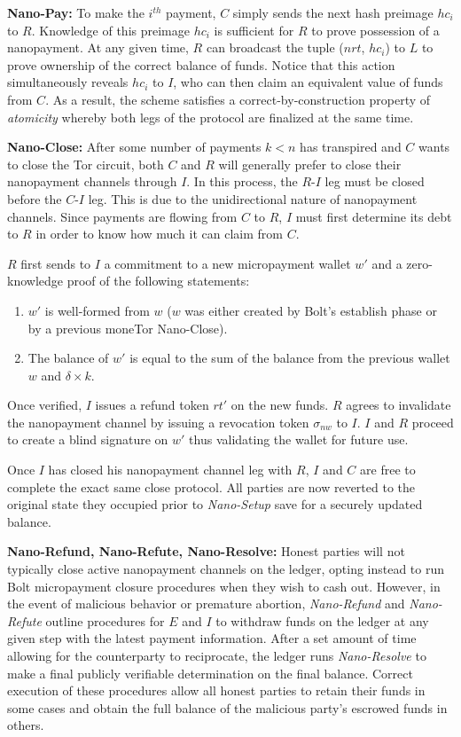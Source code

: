 \medskip \noindent\textbf{Nano-Pay:} To make the $i^{th}$ payment, $C$ simply sends the next hash preimage $hc_i$ to $R$.
Knowledge of this preimage $hc_i$ is sufficient for $R$ to prove possession of a nanopayment.
At any given time, $R$ can broadcast the tuple ($nrt$, $hc_i$) to $L$ to prove ownership of the correct balance of funds.
Notice that this action simultaneously reveals $hc_i$ to $I$, who can then claim an equivalent value of funds from $C$.
As a result, the scheme satisfies a correct-by-construction property of \emph{atomicity} whereby both legs of the protocol are finalized at the same time.

\medskip \noindent\textbf{Nano-Close:} After some number of payments $k < n$ has transpired and $C$ wants to close the Tor circuit, both $C$ and $R$ will generally prefer to close their nanopayment channels through $I$.
In this process, the $R$-$I$ leg must be closed before the $C$-$I$ leg.
This is due to the unidirectional nature of nanopayment channels.
Since payments are flowing from $C$ to $R$, $I$ must first determine its debt to $R$ in order to know how much it can claim from $C$.

$R$ first sends to $I$ a commitment to a new micropayment wallet $w'$ and a zero-knowledge proof of the following statements:

\begin{enumerate}
\item $w'$ is well-formed from $w$ ($w$ was either created by Bolt's establish phase or by a previous moneTor Nano-Close).
\item The balance of $w'$ is equal to the sum of the balance from the previous wallet $w$ and $\delta \times k$.
\end{enumerate}

Once verified, $I$ issues a refund token $rt'$ on the new funds.
$R$ agrees to invalidate the nanopayment channel by issuing a revocation token $\sigma_{nw}$ to $I$.
$I$ and $R$ proceed to create a blind signature on $w'$ thus validating the wallet for future use.

Once $I$ has closed his nanopayment channel leg with $R$, $I$ and $C$ are free to complete the exact same close protocol.
All parties are now reverted to the original state they occupied prior to \emph{Nano-Setup} save for a securely updated balance.

\medskip \noindent\textbf{Nano-Refund, Nano-Refute, Nano-Resolve:} Honest parties will not typically close active nanopayment channels on the ledger, opting instead to run Bolt micropayment closure procedures when they wish to cash out.
However, in the event of malicious behavior or premature abortion, \emph{Nano-Refund} and \emph{Nano-Refute} outline procedures for $E$ and $I$ to withdraw funds on the ledger at any given step with the latest payment information.
After a set amount of time allowing for the counterparty to reciprocate, the ledger runs \emph{Nano-Resolve} to make a final publicly verifiable determination on the final balance.
Correct execution of these procedures allow all honest parties to retain their funds in some cases and obtain the full balance of the malicious party's escrowed funds in others.

